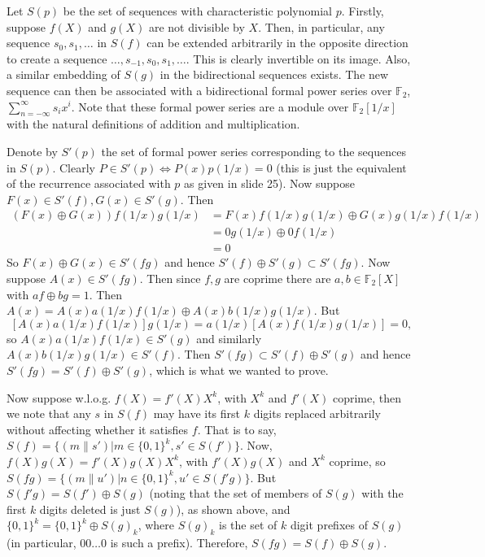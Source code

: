 Let $S(p)$ be the set of sequences with characteristic polynomial $p$. Firstly, suppose
$f(X)$ and $g(X)$ are not divisible by $X$. Then, in particular,
any sequence $s_0,s_1,\dots$ in $S(f)$ can be extended arbitrarily in the opposite
direction to create a sequence $\dots,s_{-1},s_0,s_1,\dots$. This is clearly
invertible on its image. Also, a similar embedding of $S(g)$ in the bidirectional
sequences exists.
The new sequence can then be associated with a bidirectional formal power series over
$\mathbb{F}_2$, $\sum_{n=-\infty}^\infty s_ix^i$. Note that these formal power
series are a module over $\mathbb{F}_2[1/x]$ with the natural definitions of addition
and multiplication. 

Denote by $S'(p)$ the set of formal power series corresponding
to the sequences in $S(p)$. Clearly $P \in S'(p) \Leftrightarrow P(x)p(1/x)=0$ (this
is just the equivalent of the recurrence associated with $p$ as given in \cite{slides}
slide 25). Now suppose $F(x)\in S'(f),G(x)\in S'(g)$. Then 
\begin{align*}
(F(x) \oplus G(x))f(1/x)g(1/x) &= F(x)f(1/x)g(1/x)\oplus G(x)g(1/x)f(1/x) \\
&= 0g(1/x)\oplus 0f(1/x) \\
&= 0
\end{align*}
So $F(x) \oplus G(x) \in S'(fg)$ and hence $S'(f)\oplus S'(g) \subset S'(fg)$.
Now suppose $A(x) \in S'(fg)$. Then since $f,g$ are
coprime there are $a,b \in \mathbb{F}_2[X]$ with $af\oplus bg=1$. Then
$A(x)=A(x)a(1/x)f(1/x)\oplus A(x)b(1/x)g(1/x)$. But 
\[[A(x)a(1/x)f(1/x)]g(1/x)=a(1/x)[A(x)f(1/x)g(1/x)]=0,\] so
$A(x)a(1/x)f(1/x) \in S'(g)$ and similarly
$A(x)b(1/x)g(1/x) \in S'(f)$. Then $S'(fg) \subset S'(f)\oplus S'(g)$ and hence
$S'(fg) = S'(f) \oplus S'(g)$, which is what we wanted to prove.

Now suppose w.l.o.g. $f(X)=f'(X)X^k$, with $X^k$ and $f'(X)$ coprime,
then we note that any $s$ in $S(f)$ may have its 
first $k$ digits replaced arbitrarily without affecting whether it satisfies $f$.
That is to say, $S(f)=\{(m\|s') |m\in\{0,1\}^k, s' \in S(f')  \}$.
Now, $f(X)g(X)=f'(X)g(X)X^k$, with $f'(X)g(X)$ and $X^k$ coprime, so 
$S(fg)=\{(m\|u') |n\in\{0,1\}^k, u' \in S(f'g)\}$. But $S(f'g)=S(f')\oplus S(g)$ (noting
that the set of members of $S(g)$ with the first $k$ digits deleted is just $S(g)$),
as shown above, and $\{0,1\}^k = \{0,1\}^k \oplus S(g)_k$, where $S(g)_k$ is the
set of $k$ digit prefixes of $S(g)$ (in particular, $00\dots0$ is such a prefix).
Therefore, $S(fg)=S(f)\oplus S(g)$.
